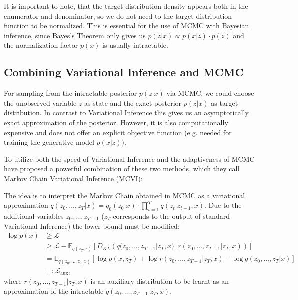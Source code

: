 \documentclass[12pt]{scrartcl}
\newcommand{\E}{\mathbb{E}}
\begin{document}
It is important to note, that the target distribution density appears both in the enumerator and denominator, so we do not need to the target distribution function to be normalized. This is essential for the use of MCMC with Bayesian inference, since Bayes's Theorem only gives us $p(z|x) \propto p(x|z) \cdot p(z)$ and the normalization factor $p(x)$ is usually intractable.

\subsection{Combining Variational Inference and MCMC}
\label{sec:MCVI}
For sampling from the intractable posterior $p(z|x)$ via MCMC, we could choose the unobserved variable $z$ as state and the exact posterior $p(z|x)$ as target distribution. In contrast to Variational Inference this gives us an asymptotically exact approximation of the posterior. However, it is also computationally expensive and does not offer an explicit objective function (e.g. needed for training the generative model $p(x|z)$).

To utilize both the speed of Variational Inference and the adaptiveness of MCMC \citep{Salimans2014} have proposed a powerful combination of these two methods, which they call Markov Chain Variational Inference (MCVI): 

The idea is to interpret the Markov Chain obtained in MCMC as a variational approximation $q(z_0, \dots, z_T|x) = q_{0}(z_0|x) \cdot \prod_{t=1}^T q(z_t|z_{t-1}, x)$. Due to the additional variables $z_0, \dots, z_{T-1}$ ($z_T$ corresponds to the output of standard Variational Inference) the lower bound must be modified:
\begin{equation}
\begin{split}
\log p(x) &\geq \mathcal{L} \\
			   &\geq \mathcal{L} - \E_{q(z_T|x)} \left[ D_{KL} \left( q(z_0, \dots, z_{T-1} |z_T, x) || r(z_0, \dots, z_{T-1}|z_T, x) \right) \right] \\
			   &=  \E_{q(z_0, \dots, z_T|x)} \left[ \log p(x, z_T) + \log r(z_0, \dots, z_{T-1} |z_T, x) - \log q(z_0, \dots, z_{T} |x) \right] \\
			   &\eqqcolon \mathcal{L}_{\textrm{aux}},
\end{split}
\end{equation}
where $r(z_0, \dots, z_{T-1}|z_T, x)$ is an auxiliary distribution to be learnt as an approximation of the intractable $q(z_0, \dots, z_{T-1} |z_T, x)$. 
\end{document}
